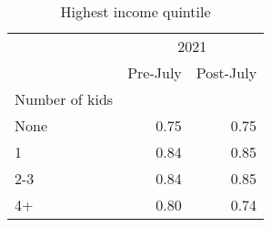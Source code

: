 \documentclass{article}
\begin{document}
\begin{table}[!h]
	\centering
	\caption{Highest income quintile}
	\begin{tabular}{lll}
		\cline{1-3}
		\multicolumn{1}{c}{} &
		\multicolumn{2}{|c}{2021} \\
		\multicolumn{1}{c}{} &
		\multicolumn{1}{|r}{Pre-July} &
		\multicolumn{1}{r}{Post-July} \\
		\cline{1-3}
		\multicolumn{1}{l}{Number of kids} &
		\multicolumn{1}{|r}{} &
		\multicolumn{1}{r}{} \\
		\multicolumn{1}{l}{\hspace{1em}None} &
		\multicolumn{1}{|r}{0.75} &
		\multicolumn{1}{r}{0.75} \\
		\multicolumn{1}{l}{\hspace{1em}1} &
		\multicolumn{1}{|r}{0.84} &
		\multicolumn{1}{r}{0.85} \\
		\multicolumn{1}{l}{\hspace{1em}2-3} &
		\multicolumn{1}{|r}{0.84} &
		\multicolumn{1}{r}{0.85} \\
		\multicolumn{1}{l}{\hspace{1em}4+} &
		\multicolumn{1}{|r}{0.80} &
		\multicolumn{1}{r}{0.74} \\
		\cline{1-3}
	\end{tabular}
\end{table}
	
	
	
	
\end{document}
